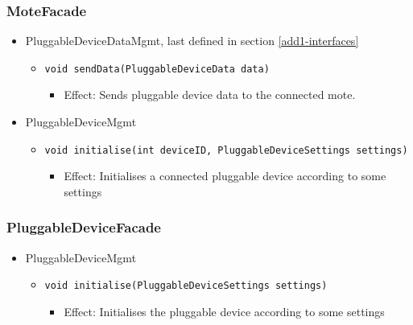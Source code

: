     \subsubsection{MoteFacade}
        \begin{itemize}
            \item PluggableDeviceDataMgmt, last defined in section \ref{add1-interfaces}
            \begin{itemize}
                \item \texttt{void sendData(PluggableDeviceData data)}
                \begin{itemize}
                    \item Effect: Sends pluggable device data to the connected mote.
                \end{itemize}
            \end{itemize}

            \item PluggableDeviceMgmt
            \begin{itemize}
                \item \texttt{void initialise(int deviceID, PluggableDeviceSettings settings)}
                \begin{itemize}
                    \item Effect: Initialises a connected pluggable device according to some settings
                \end{itemize}
            \end{itemize}
        \end{itemize}

    \subsubsection{PluggableDeviceFacade}
        \begin{itemize}
        	\item PluggableDeviceMgmt
        	\begin{itemize}
                \item \texttt{void initialise(PluggableDeviceSettings settings)}
                \begin{itemize}
                    \item Effect: Initialises the pluggable device according to some settings
                \end{itemize}
        	\end{itemize}
        \end{itemize}

